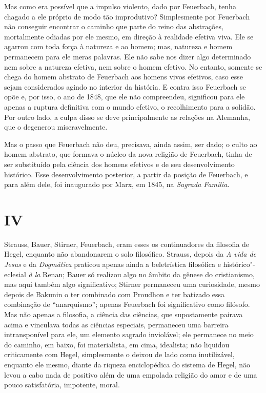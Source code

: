 Mas como era possível que a impulso violento, dado
por Feuerbach, tenha
chagado a ele próprio de modo tão improdutivo? Simplesmente por
Feuerbach não
conseguir encontrar o caminho que parte do reino das abstrações,
mortalmente odiadas por ele mesmo, em direção à realidade efetiva viva.
Ele se agarrou com toda força à natureza e ao homem; mas, natureza e
homem permanecem para ele meras palavras. Ele não sabe nos dizer algo
determinado nem sobre a natureza efetiva, nem sobre o homem efetivo. No
entanto, somente se chega do homem abstrato
de Feuerbach aos
homens vivos efetivos, caso esse sejam considerados agindo no interior
da história. E contra isso
Feuerbach se
opõe e, por isso, o ano de 1848, que ele não compreendeu, significou
para ele apenas a ruptura definitiva com o mundo efetivo, o recolhimento
para a solidão. Por outro lado, a culpa disso se deve principalmente as
relações na Alemanha, que o degenerou miseravelmente.

Mas o passo
que Feuerbach não
deu, precisava, ainda assim, ser dado; o culto ao homem abstrato, que
formava o núcleo da nova religião
de Feuerbach,
tinha de ser substituído pela ciência dos homens efetivos e de seu
desenvolvimento histórico. Esse desenvolvimento posterior, a partir da
posição
de Feuerbach, e para além dele, foi inaugurado por Marx, em 1845, na \emph{Sagrada
Família.}

\quebra

\mbox{}
\vspace{2cm}

\section{IV}

\noindent{}Strauss, Bauer, Stirner, Feuerbach,
eram esses os continuadores da filosofia
de Hegel,
enquanto não abandonarem o solo
filosófico. Strauss,
depois da \emph{A vida de Jesus }\textbar{} e
da \emph{Dogmática} \textbar{} praticou
apenas ainda a beletrística filosófica e histórico"-eclesial \emph{à
la} Renan; Bauer só
realizou algo no âmbito da gênese do cristianismo, mas aqui também algo
significativo; Stirner permaneceu
uma curiosidade, mesmo depois de  Bakunin o ter combinado com Proudhon e
ter batizado essa combinação de ``anarquismo''; apenas
Feuerbach foi
significativo como filósofo. Mas não apenas a filosofia, a ciência das
ciências, que supostamente pairava acima e vinculava todas as ciências
especiais, permaneceu uma barreira intransponível para ele, um elemento
sagrado inviolável; ele permanece no meio do caminho, em baixo, foi
materialista, em cima, idealista; não liquidou criticamente
com Hegel,
simplesmente o deixou de lado como inutilizável, enquanto ele mesmo,
diante da riqueza enciclopédica do sistema
de Hegel,
não levou a cabo nada de positivo além de uma empolada religião do amor
e de uma pouco satisfatória, impotente, moral.

